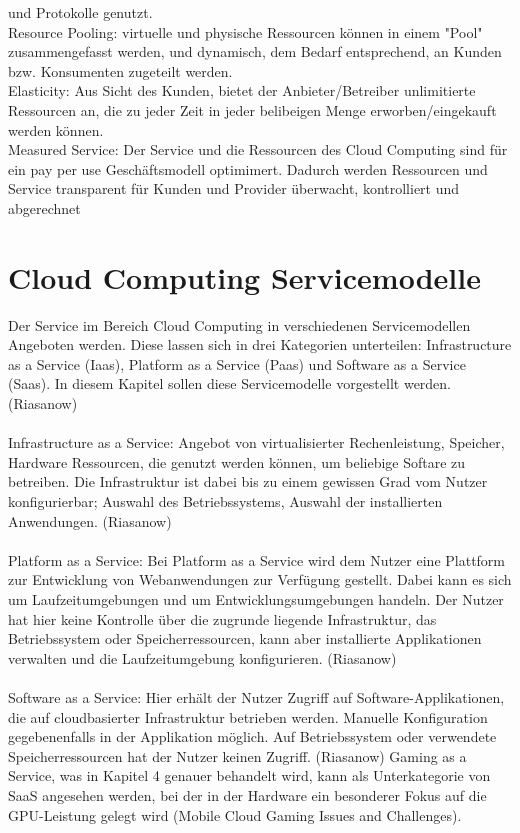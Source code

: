 \documentclass[12pt,toc=bib,toc=listof]{scrreprt}
\begin{document}
und Protokolle genutzt. \\
Resource Pooling: virtuelle und physische Ressourcen können in einem "Pool" zusammengefasst werden,
 und dynamisch, dem Bedarf entsprechend, an Kunden bzw. Konsumenten zugeteilt werden. \\
Elasticity: Aus Sicht des Kunden, bietet der Anbieter/Betreiber unlimitierte Ressourcen an,
 die zu jeder Zeit in jeder belibeigen Menge erworben/eingekauft werden können. \\
Measured Service: Der Service und die Ressourcen des Cloud Computing sind für ein pay per use Geschäftsmodell optimimert. Dadurch werden Ressourcen und Service transparent für Kunden und Provider überwacht, kontrolliert und abgerechnet 

\section{Cloud Computing Servicemodelle} %
\label{sec:Cloud Computing Servicemodelle}

Der Service im Bereich Cloud Computing in verschiedenen Servicemodellen Angeboten werden. Diese lassen sich 
in drei Kategorien unterteilen:
 Infrastructure as a Service (Iaas), Platform as a Service (Paas) und Software as a Service (Saas). 
 In diesem Kapitel sollen diese Servicemodelle vorgestellt werden. (Riasanow)
\\ \\ 
Infrastructure as a Service: Angebot von virtualisierter Rechenleistung, Speicher, Hardware Ressourcen, die genutzt werden können, um beliebige Softare zu betreiben.
Die Infrastruktur ist dabei bis zu einem gewissen Grad vom Nutzer konfigurierbar; Auswahl des Betriebssystems, Auswahl der installierten Anwendungen. (Riasanow)
\\ \\
Platform as a Service: Bei Platform as a Service wird dem Nutzer eine Plattform zur Entwicklung von Webanwendungen zur Verfügung gestellt. Dabei kann es sich 
um Laufzeitumgebungen und um Entwicklungsumgebungen handeln. Der Nutzer hat hier keine Kontrolle über die zugrunde liegende Infrastruktur, 
das Betriebssystem oder Speicherressourcen, kann aber installierte Applikationen verwalten und die Laufzeitumgebung konfigurieren. (Riasanow)
\\ \\
Software as a Service: Hier erhält der Nutzer Zugriff auf Software-Applikationen, die auf cloudbasierter Infrastruktur betrieben werden.
Manuelle Konfiguration gegebenenfalls in der Applikation möglich. Auf Betriebssystem oder verwendete Speicherressourcen hat der Nutzer keinen Zugriff. (Riasanow)
Gaming as a Service, was in Kapitel 4 genauer behandelt wird, kann als Unterkategorie von SaaS angesehen werden, bei der in der Hardware ein besonderer Fokus auf die 
GPU-Leistung gelegt wird (Mobile Cloud Gaming Issues and Challenges).
\end{document}
